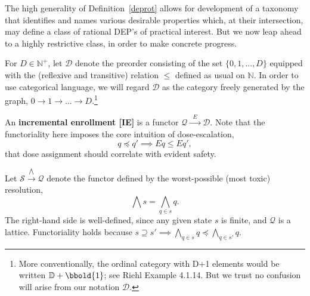 \documentclass{article}
\newcommand{\N}{\mathbb{N}}
\renewcommand{\S}{\ensuremath{\mathcal{S}}} %
\newcommand{\C}{\ensuremath{\mathcal{C}}}
\newcommand{\D}{\ensuremath{\mathcal{D}}}
\newcommand{\Q}{\ensuremath{\mathcal{Q}}}
\begin{document}
The high generality of Definition~\ref{deprot} allows for development of a taxonomy that identifies and names various desirable properties which, at their intersection, may define a class of rational DEP's of practical interest.  But we now leap ahead to a highly restrictive class, in order to make concrete progress.

\begin{nota}
  For $D \in \N^+$, let $\D$ denote the preorder consisting of the set $\{0, 1, ..., D\}$ equipped with the (reflexive and transitive) relation $\le$ defined as usual on $\N$.  In order to use categorical language, we will regard $\D$ as the category freely generated by the graph, $0 \rightarrow 1 \rightarrow \dots \rightarrow D$.\footnote{More conventionally, the ordinal category with D+1 elements would be written $\mathbb{D}+\bbold{1}$; see Riehl Example 4.1.14.  But we trust no confusion will arise from our notation $\D$.}
\end{nota}

\begin{defn}
  An \textbf{incremental enrollment [IE]} is a functor $\Q \xrightarrow{\;\;E\;\;} \D$.  Note that the functoriality here imposes the core intuition of dose-escalation,
  $$
  q \preceq q' \implies E q \le E q',
  $$
  that dose assignment should correlate with evident safety.
\end{defn}

\begin{nota}
  Let $\S \xrightarrow{\bigwedge} \Q$ denote the functor defined by the worst-possible (most toxic) resolution,
  $$
  \bigwedge s = \bigwedge_{q \in s} q.
  $$
  The right-hand side is well-defined, since any given state $s$ is finite, and $\Q$ is a lattice.  Functoriality holds because $s \supseteq s' \implies \bigwedge_{q \in s} q \preceq \bigwedge_{q \in s'} q$.
\end{nota}

\end{document}
